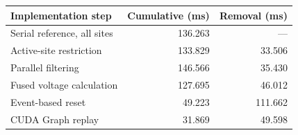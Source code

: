 \begin{tabularx}{\textwidth}{Xrr}
\toprule
Implementation step & Cumulative (ms) & Removal (ms)\\
\midrule
Serial reference, all sites & 136.263 & --- \\
Active-site restriction & 133.829 & 33.506 \\
Parallel filtering & 146.566 & 35.430 \\
Fused voltage calculation & 127.695 & 46.012 \\
Event-based reset & 49.223 & 111.662 \\
CUDA Graph replay & 31.869 & 49.598 \\
\bottomrule
\end{tabularx}
